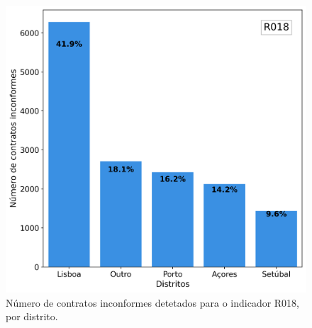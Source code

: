 \begin{figure}[H]
\begin{minipage}{.44\linewidth}
	\end{minipage}
	\hfill
	\begin{minipage}{.44\linewidth}
		\includegraphics[width=\linewidth]{imagens/final/bar_R018.png}
		\caption{Número de contratos inconformes detetados para o indicador R018, por distrito.}
		\label{final9}
		
	\end{minipage}
\end{figure}


